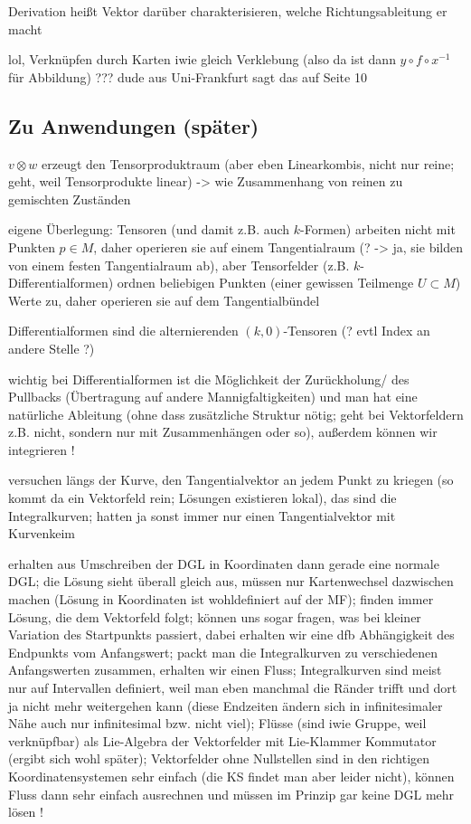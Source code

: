 Derivation heißt Vektor darüber charakterisieren, welche Richtungsableitung er macht


lol, Verknüpfen durch Karten iwie gleich Verklebung (also da ist dann $y \circ f \circ x^{-1}$ für Abbildung) ??? dude aus Uni-Frankfurt sagt das auf Seite 10



		\subsection*{Zu Anwendungen (später)}
$v \otimes w$ erzeugt den Tensorproduktraum (aber eben Linearkombis, nicht nur reine; geht, weil Tensorprodukte linear) -> wie Zusammenhang von reinen zu gemischten Zuständen

eigene Überlegung: Tensoren (und damit z.B. auch $k$-Formen) arbeiten nicht mit Punkten $p \in M$, daher operieren sie auf einem Tangentialraum (? -> ja, sie bilden von einem festen Tangentialraum ab), aber Tensorfelder (z.B. $k$-Differentialformen) ordnen beliebigen Punkten (einer gewissen Teilmenge $U \subset M$) Werte zu, daher operieren sie auf dem Tangentialbündel


Differentialformen sind die alternierenden $(k, 0)$-Tensoren (? evtl Index an andere Stelle ?)

wichtig bei Differentialformen ist die Möglichkeit der Zurückholung/ des Pullbacks (Übertragung auf andere Mannigfaltigkeiten) und man hat eine natürliche Ableitung (ohne dass zusätzliche Struktur nötig; geht bei Vektorfeldern z.B. nicht, sondern nur mit Zusammenhängen oder so), außerdem können wir integrieren !


versuchen längs der Kurve, den Tangentialvektor an jedem Punkt zu kriegen (so kommt da ein Vektorfeld rein; Lösungen existieren lokal), das sind die Integralkurven; hatten ja sonst immer nur einen Tangentialvektor mit Kurvenkeim

erhalten aus Umschreiben der DGL in Koordinaten dann gerade eine normale DGL; die Lösung sieht überall gleich aus, müssen nur Kartenwechsel dazwischen machen (Lösung in Koordinaten ist wohldefiniert auf der MF); finden immer Lösung, die dem Vektorfeld folgt; können uns sogar fragen, was bei kleiner Variation des Startpunkts passiert, dabei erhalten wir eine dfb Abhängigkeit des Endpunkts vom Anfangswert; packt man die Integralkurven zu verschiedenen Anfangswerten zusammen, erhalten wir einen Fluss; Integralkurven sind meist nur auf Intervallen definiert, weil man eben manchmal die Ränder trifft und dort ja nicht mehr weitergehen kann (diese Endzeiten ändern sich in infinitesimaler Nähe auch nur infinitesimal bzw. nicht viel); Flüsse (sind iwie Gruppe, weil verknüpfbar) als Lie-Algebra der Vektorfelder mit Lie-Klammer Kommutator (ergibt sich wohl später); Vektorfelder ohne Nullstellen sind in den richtigen Koordinatensystemen sehr einfach (die KS findet man aber leider nicht), können Fluss dann sehr einfach ausrechnen und müssen im Prinzip gar keine DGL mehr lösen !


